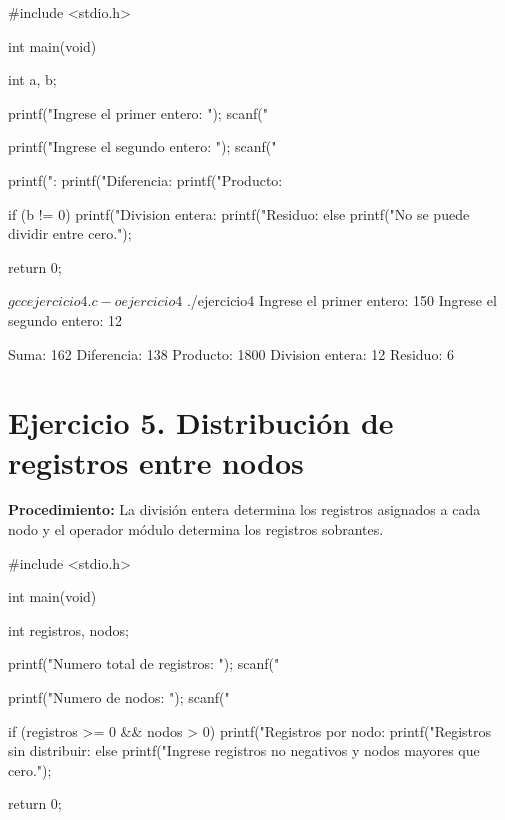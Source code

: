 \documentclass[11pt, a4paper]{article}
\begin{document}
\begin{codebox}[title={CÓDIGO FUENTE EN C: Ejercicio 4}]
#include <stdio.h>

int main(void) {
    int a, b;

    printf("Ingrese el primer entero: ");
    scanf("%

    printf("Ingrese el segundo entero: ");
    scanf("%

    printf("\nSuma: %
    printf("Diferencia: %
    printf("Producto: %

    if (b != 0) {
        printf("Division entera: %
        printf("Residuo: %
    } else {
        printf("No se puede dividir entre cero.\n");
    }

    return 0;
}
\end{codebox}

\begin{terminalout}
$ gcc ejercicio4.c -o ejercicio4
$ ./ejercicio4
Ingrese el primer entero: 150
Ingrese el segundo entero: 12

Suma: 162
Diferencia: 138
Producto: 1800
Division entera: 12
Residuo: 6
\end{terminalout}

\newpage

\section*{Ejercicio 5. Distribución de registros entre nodos}
\textbf{Procedimiento:} La división entera determina los registros asignados a cada nodo y el operador módulo determina los registros sobrantes.

\begin{codebox}[title={CÓDIGO FUENTE EN C: Ejercicio 5}]
#include <stdio.h>

int main(void) {
    int registros, nodos;

    printf("Numero total de registros: ");
    scanf("%

    printf("Numero de nodos: ");
    scanf("%

    if (registros >= 0 && nodos > 0) {
        printf("Registros por nodo: %
        printf("Registros sin distribuir: %
    } else {
        printf("Ingrese registros no negativos y nodos mayores que cero.\n");
    }

    return 0;
}
\end{codebox}
\end{document}
